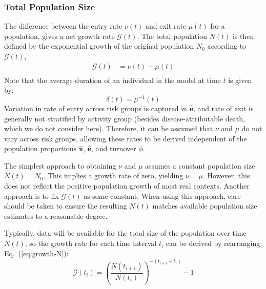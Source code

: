 \subsubsection{Total Population Size}\label{sss:params-nu-mu}
The difference between the entry rate $\nu(t)$ and exit rate $\mu(t)$ for a population,
gives a net growth rate $\mathcal{G}(t)$.
The total population $N(t)$ is then defined by the exponential growth
of the original population $N_0$ according to $\mathcal{G}(t)$,
\begin{subequations}
  \begin{align}
  \mathcal{G}(t) &= \nu(t) - \mu(t)            \label{eq:growth-G}\\
  \end{align}
\end{subequations}
Note that the average duration of an individual in the model at time $t$ is given by:
\begin{equation} \label{eq:duration-model}
\delta(t) = \mu^{-1}(t)
\end{equation}
Variation in rate of entry across risk groups is captured in $\bm{\hat{e}}$,
and rate of exit is generally not stratified by activity group
(besides disease-attributable death, which we do not consider here).
Therefore, it can be assumed that $\nu$ and $\mu$ do not vary across risk groups,
allowing these rates to be derived independent of
the population proportions $\bm{\hat{x}}$, $\bm{\hat{e}}$, and turnover $\phi$.
\par
The simplest approach to obtaining $\nu$ and $\mu$ assumes
a constant population size $N(t) = N_0$.
This implies a growth rate of zero, yielding $\nu = \mu$.
However, this does not reflect the positive population growth of most real contexts.
Another approach is to fix $\mathcal{G}(t)$ as some constant.
When using this approach, care should be taken to ensure
the resulting $N(t)$ matches available population size estimates to a reasonable degree.
\par
Typically, data will be available for the total size of the population over time $N(t)$,
so the growth rate for each time interval $t_i$
can be derived by rearranging Eq.~(\ref{eq:growth-N}):
\begin{equation}
\mathcal{G}(t_i) = {\left(\frac{N(t_{i+1})}{N(t_{i})}\right)}^{-(t_{i+1}-t_i)} - 1
\end{equation}
